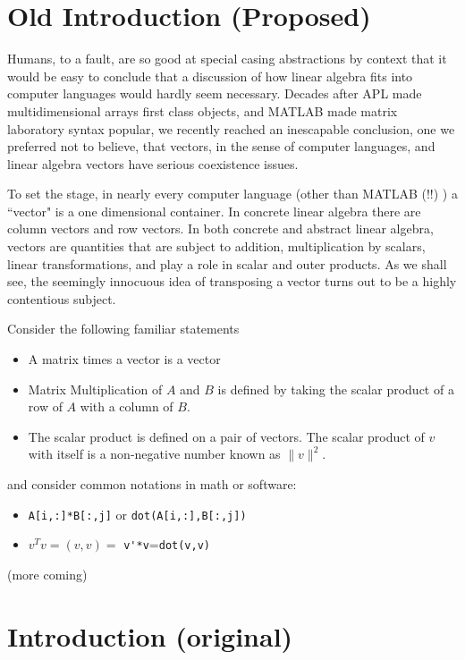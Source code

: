 \section{Old Introduction (Proposed) }

Humans, to a fault, are so good at special casing abstractions
by context that it would be easy to conclude that a discussion
of how linear algebra fits into computer languages would hardly
seem necessary.  Decades after APL made multidimensional
arrays first class objects, and MATLAB made matrix laboratory
syntax popular,  we recently  reached an inescapable conclusion,
one we preferred not to believe, that  
vectors, in the sense of computer languages,
and linear algebra vectors have serious coexistence issues.



To set the stage, in nearly every computer language (other than MATLAB (!!) )
a ``vector"  is a one dimensional container.  In concrete
linear algebra there are column vectors and row vectors.
In  both concrete and abstract linear algebra, vectors are quantities that are subject
to addition, multiplication by scalars, linear transformations, and 
play a role in scalar and outer products.
As we shall see, the  seemingly innocuous idea of transposing a vector turns out to be
a highly contentious subject.


Consider the following familiar  statements  \begin{itemize}
\item A matrix times a vector is a vector
\item Matrix Multiplication of $A$ and $B$ is defined by taking the scalar product
of a row of $A$ with a column of $B$.
\item  The scalar product is defined on a pair of vectors.
The scalar product of  $v$ with itself is a non-negative number known as
$\|v\|^2$.
\end{itemize}

and consider common  notations in math or software:
\begin{itemize}
\item  \verb+A[i,:]*B[:,j]+ or \verb+dot(A[i,:],B[:,j]) +
\item   $v^T\!v=(v,v)=$ \verb+v'*v+=\verb+dot(v,v)+
\end{itemize}

(more coming)

 




\section{Introduction (original)}



